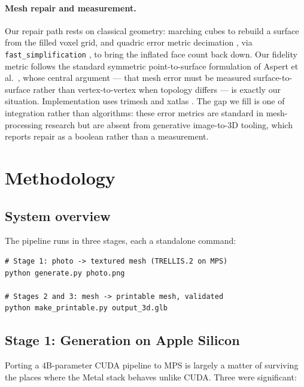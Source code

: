 \documentclass[11pt,a4paper]{article}
\begin{document}
\paragraph{Mesh repair and measurement.}
Our repair path rests on classical geometry: marching cubes
\cite{lorensen1987marchingcubes} to rebuild a surface from the filled voxel
grid, and quadric error metric decimation \cite{garland1997qem}, via
\texttt{fast\_simplification} \cite{fastsimplification}, to bring the inflated
face count back down. Our fidelity metric follows the standard symmetric
point-to-surface formulation of Aspert et al.~\cite{aspert2002mesh}, whose
central argument --- that mesh error must be measured surface-to-surface rather
than vertex-to-vertex when topology differs --- is exactly our situation.
Implementation uses trimesh \cite{trimesh} and xatlas \cite{xatlas}. The gap we
fill is one of integration rather than algorithms: these error metrics are
standard in mesh-processing research but are absent from generative
image-to-3D tooling, which reports repair as a boolean rather than a
measurement.

\section{Methodology}

\subsection{System overview}

The pipeline runs in three stages, each a standalone command:

\begin{lstlisting}[caption={The pipeline end to end.}]
# Stage 1: photo -> textured mesh (TRELLIS.2 on MPS)
python generate.py photo.png

# Stages 2 and 3: mesh -> printable mesh, validated
python make_printable.py output_3d.glb
\end{lstlisting}

\subsection{Stage 1: Generation on Apple Silicon}

Porting a 4B-parameter CUDA pipeline to MPS is largely a matter of surviving
the places where the Metal stack behaves unlike CUDA. Three were significant:
\end{document}
